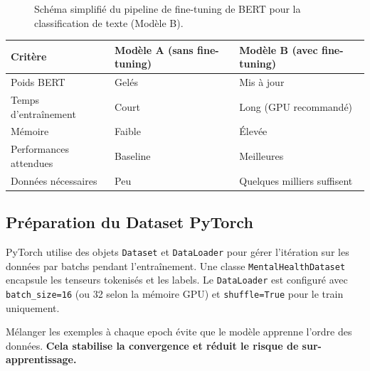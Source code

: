 \documentclass[12pt,a4paper]{article}
\begin{document}
\begin{figure}[H]
\begin{center}
\caption{\centering\small Schéma simplifié du pipeline de fine-tuning de BERT
  pour la classification de texte (Modèle B).}
\end{center}
\end{figure}

\begin{center}
\begin{tabular}{@{}lll@{}}
  \toprule
  Critère & Modèle A (sans fine-tuning) & Modèle B (avec fine-tuning) \\
  \midrule
  Poids BERT & Gelés & Mis à jour \\
  Temps d'entraînement & Court & Long (GPU recommandé) \\
  Mémoire & Faible & Élevée \\
  Performances attendues & Baseline & Meilleures \\
  Données nécessaires & Peu & Quelques milliers suffisent \\
  \bottomrule
\end{tabular}
\end{center}

\subsection{Préparation du Dataset PyTorch}

PyTorch utilise des objets \texttt{Dataset} et \texttt{DataLoader} pour gérer l'itération
sur les données par batchs pendant l'entraînement. Une classe \texttt{MentalHealthDataset}
encapsule les tenseurs tokenisés et les labels. Le \texttt{DataLoader} est configuré avec
\texttt{batch\_size=16} (ou 32 selon la mémoire GPU) et \texttt{shuffle=True} pour le
train uniquement.

\begin{tipbox}[Pourquoi mélanger (\texttt{shuffle=True}) ?]
Mélanger les exemples à chaque epoch évite que le modèle apprenne l'ordre des données.
\textbf{Cela stabilise la convergence et réduit le risque de sur-apprentissage.}
\end{tipbox}
\end{document}
